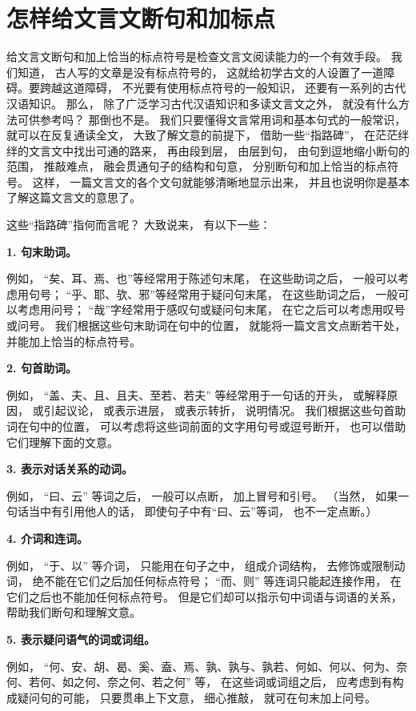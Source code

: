 \section{怎样给文言文断句和加标点}

给文言文断句和加上恰当的标点符号是检查文言文阅读能力的一个有效手段。
我们知道，
古人写的文章是没有标点符号的，
这就给初学古文的人设置了一道障碍。要跨越这道障碍，
不光要有使用标点符号的一般知识，
还要有一系列的古代汉语知识。
那么，
除了广泛学习古代汉语知识和多读文言文之外，
就没有什么方法可供参考吗？
那倒也不是。
我们只要懂得文言常用词和基本句式的一般常识，
就可以在反复通读全文，
大致了解文意的前提下，
借助一些“指路碑”，
在茫茫绊绊的文言文中找出可通的路来，
再由段到层，
由层到句，
由句到逗地缩小断句的范围，
推敲难点，
融会贯通句子的结构和句意，
分别断句和加上恰当的标点符号。
这样，
一篇文言文的各个文句就能够清晰地显示出来，
并且也说明你是基本了解这篇文言文的意思了。

这些“指路碑”指何而言呢？
大致说来，
有以下一些：
\newpage

\textbf{1. 句末助词。}

例如，
“矣、耳、焉、也”等经常用于陈述句末尾，
在这些助词之后，
一般可以考虑用句号；
“乎、耶、欤、邪”等经常用于疑问句末尾，
在这些助词之后，
一般可以考虑用问号；
“哉”字经常用于感叹句或疑问句末尾，
在它之后可以考虑用叹号或问号。
我们根据这些句末助词在句中的位置，
就能将一篇文言文点断若干处，
并能加上恰当的标点符号。

\textbf{2. 句首助词。}

例如，
“盖、夫、且、且夫、至若、若夫”
等经常用于一句话的开头，
或解释原因，
或引起议论，
或表示进层，
或表示转折，
说明情况。
我们根据这些句首助词在句中的位置，
可以考虑将这些词前面的文字用句号或逗号断开，
也可以借助它们理解下面的文意。

\textbf{3. 表示对话关系的动词。}

例如，
“曰、云”
等词之后，
一般可以点断，
加上冒号和引号。
（当然，
如果一句话当中有引用他人的话，
即使句子中有“曰、云”等词，
也不一定点断。）

\textbf{4. 介词和连词。}

例如，
“于、以”
等介词，
只能用在句子之中，
组成介词结构，
去修饰或限制动词，
绝不能在它们之后加任何标点符号；
“而、则”
等连词只能起连接作用，
在它们之后也不能加任何标点符号。
但是它们却可以指示句中词语与词语的关系，
帮助我们断句和理解文意。

\textbf{5. 表示疑问语气的词或词组。}

例如，
“何、安、胡、曷、奚、盍、焉、孰、孰与、孰若、何如、何以、何为、奈何、若何、如之何、奈之何、若之何”
等，
在这些词或词组之后，
应考虑到有构成疑问句的可能，
只要贯串上下文意，
细心推敲，
就可在句末加上问号。

